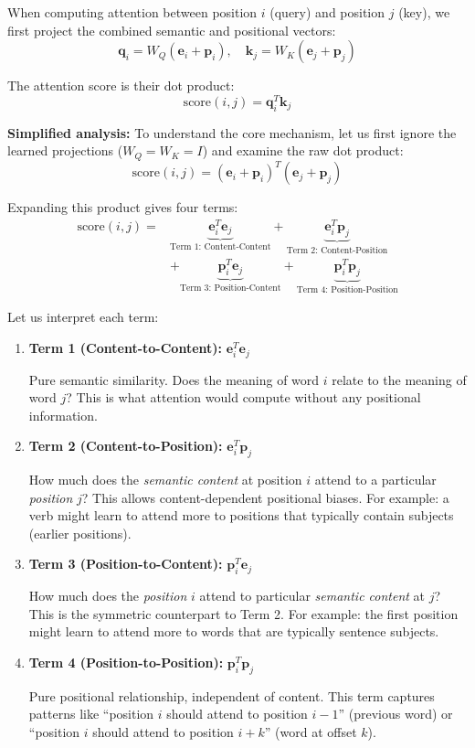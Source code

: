 \documentclass{article}
\begin{document}
When computing attention between position $i$ (query) and position $j$ (key), we first project the combined semantic and positional vectors:
\[
\mathbf{q}_i = W_Q(\mathbf{e}_i + \mathbf{p}_i), \quad \mathbf{k}_j = W_K(\mathbf{e}_j + \mathbf{p}_j)
\]

The attention score is their dot product:
\[
\text{score}(i, j) = \mathbf{q}_i^T \mathbf{k}_j
\]

\textbf{Simplified analysis:} To understand the core mechanism, let us first ignore the learned projections ($W_Q = W_K = I$) and examine the raw dot product:
\[
\text{score}(i, j) = (\mathbf{e}_i + \mathbf{p}_i)^T (\mathbf{e}_j + \mathbf{p}_j)
\]

Expanding this product gives four terms:
\begin{align}
\text{score}(i, j) = &\underbrace{\mathbf{e}_i^T \mathbf{e}_j}_{\text{Term 1: Content-Content}} + \underbrace{\mathbf{e}_i^T \mathbf{p}_j}_{\text{Term 2: Content-Position}} \\
&+ \underbrace{\mathbf{p}_i^T \mathbf{e}_j}_{\text{Term 3: Position-Content}} + \underbrace{\mathbf{p}_i^T \mathbf{p}_j}_{\text{Term 4: Position-Position}}
\end{align}

Let us interpret each term:

\begin{enumerate}
\item \textbf{Term 1 (Content-to-Content):} $\mathbf{e}_i^T \mathbf{e}_j$

Pure semantic similarity. Does the meaning of word $i$ relate to the meaning of word $j$? This is what attention would compute without any positional information.

\item \textbf{Term 2 (Content-to-Position):} $\mathbf{e}_i^T \mathbf{p}_j$

How much does the \textit{semantic content} at position $i$ attend to a particular \textit{position} $j$? This allows content-dependent positional biases. For example: a verb might learn to attend more to positions that typically contain subjects (earlier positions).

\item \textbf{Term 3 (Position-to-Content):} $\mathbf{p}_i^T \mathbf{e}_j$

How much does the \textit{position} $i$ attend to particular \textit{semantic content} at $j$? This is the symmetric counterpart to Term 2. For example: the first position might learn to attend more to words that are typically sentence subjects.

\item \textbf{Term 4 (Position-to-Position):} $\mathbf{p}_i^T \mathbf{p}_j$

Pure positional relationship, independent of content. This term captures patterns like ``position $i$ should attend to position $i-1$'' (previous word) or ``position $i$ should attend to position $i+k$'' (word at offset $k$).
\end{enumerate}
\end{document}
